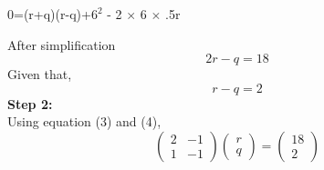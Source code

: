 \documentclass[10pt,a4paper]{article}
\begin{document}
\begin{multicols}{2}
{\begin{center}
0=(r+q)(r-q)+${6}^2$ - 2 $\times$ 6 $\times$ .5r\\
\vspace{5mm}
\end{center}
After simplification
\begin{equation}
	   2r-q =18
\end{equation}
Given that,
\begin{equation}
	r-q=2
\end{equation}
\textbf{Step 2:}\vspace{2mm}\\

Using equation (3) and (4),
\begin{equation}
  \begin{pmatrix}
2 & -1\\
1 &-1
\end{pmatrix} 
\begin{pmatrix}
r\\
q
\end{pmatrix} 
=
\begin{pmatrix}
18 \\ 
 2\
\end{pmatrix}
\end{equation}\vspace{2mm}\\


}
\end{multicols}
\end{document}

